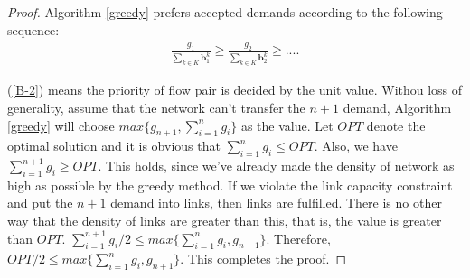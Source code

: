 \documentclass[sigconf]{acmart}
\begin{document}
\begin{appendices}
\begin{proof}
Algorithm \ref{greedy} prefers accepted demands according to the following sequence:
 \begin{eqnarray} \label{B-2}
\frac{g_1}{\sum_{k\in K}\mathbf{b}^k_1} \ge \frac{g_2}{\sum_{k\in K}\mathbf{b}^k_2} \ge ....
\end{eqnarray}

(\ref{B-2})  means the priority of flow pair is decided by the unit value.
Withou loss of generality, assume that the network can't transfer the $n+1$ demand,  
Algorithm \ref{greedy} will choose $max\{g_{n+1},\sum_{i=1}^{n}g_i\}$ as the value.
Let $OPT$ denote the optimal solution and it is obvious that  $\sum_{i=1}^{n} g_i\le OPT$.
Also, we have  $\sum_{i=1}^{n+1} g_i\ge OPT$.
This holds, since we've already made the density of network as high as possible by the greedy method.
If we violate the link capacity constraint and put the $n+1$ demand into links, then  links are fulfilled.
There is no other way that the density of links are greater than this, that is, the value is greater than $OPT$. 
 $\sum_{i=1}^{n+1} g_i/2 \le max\{\sum_{i=1}^{n} g_i,g_{n+1}\}$.
 Therefore, $OPT/2 \le max\{\sum_{i=1}^{n} g_i,g_{n+1}\}$. This completes the
proof.
\end{proof}

 \end{appendices}
 
\end{document}
